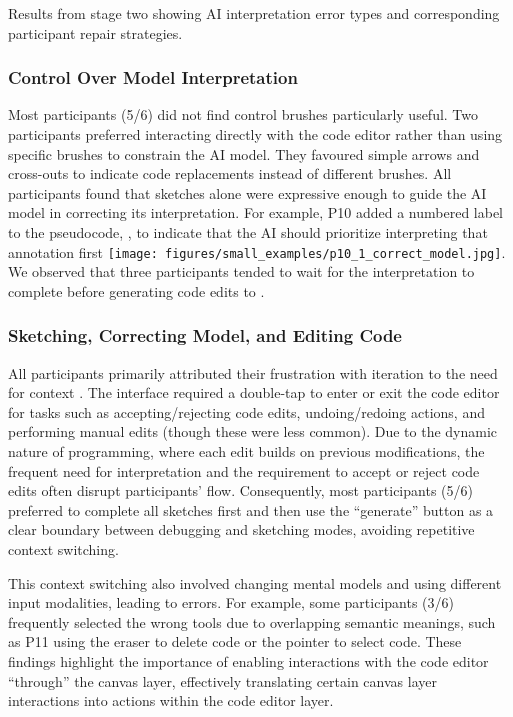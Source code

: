 \begin{table*}[hbt]
    \caption{Results from stage two showing AI interpretation error types and corresponding participant repair strategies.}
    \centering
    
    \label{tab:error-strat}
\end{table*}




\subsubsection{Control Over Model Interpretation}
Most participants (5/6) did not find control brushes particularly useful. Two participants preferred interacting directly with the code editor rather than using specific brushes to constrain the AI model. They favoured simple arrows and cross-outs to indicate code replacements instead of different brushes. All participants found that sketches alone were expressive enough to guide the AI model in correcting its interpretation.
For example, P10 added a numbered label to the pseudocode, , to indicate that the AI should prioritize interpreting that annotation first \texttt{[image: figures/small\_examples/p10\_1\_correct\_model.jpg]}.
We observed that three participants tended to wait for the interpretation to complete before generating code edits to .




\subsubsection{Sketching, Correcting Model, and Editing Code}
All participants primarily attributed their frustration with iteration to the need for context . The interface required a double-tap to enter or exit the code editor for tasks such as accepting/rejecting code edits, undoing/redoing actions, and performing manual edits (though these were less common). Due to the dynamic nature of programming, where each edit builds on previous modifications, the frequent need for interpretation and the requirement to accept or reject code edits often disrupt participants' flow. Consequently, most participants (5/6) preferred to complete all sketches first and then use the ``generate'' button as a clear boundary between debugging and sketching modes, avoiding repetitive context switching.

This context switching also involved changing mental models and using different input modalities, leading to errors. For example, some participants (3/6) frequently selected the wrong tools due to overlapping semantic meanings, such as P11 using the eraser to delete code or the pointer to select code. These findings highlight the importance of enabling interactions with the code editor ``through'' the canvas layer, effectively translating certain canvas layer interactions into actions within the code editor layer.

